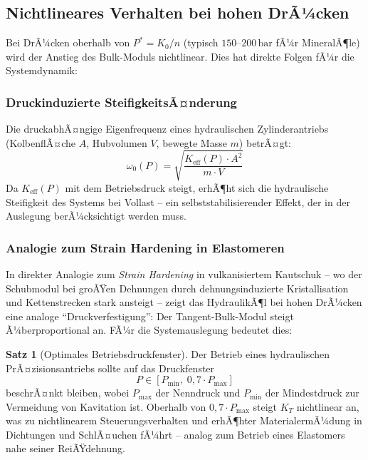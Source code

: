 ﻿\documentclass[a4paper,12pt]{scrreprt}
\theoremstyle{definition}
\newtheorem{satz}{Satz}[section]
\begin{document}
\subsection{Nichtlineares Verhalten bei hohen DrÃ¼cken}

Bei DrÃ¼cken oberhalb von $P^* = K_0 / n$ (typisch $150$--$200\,\mathrm{bar}$
fÃ¼r MineralÃ¶le) wird der Anstieg des Bulk-Moduls nichtlinear. Dies hat
direkte Folgen fÃ¼r die Systemdynamik:

\subsubsection{Druckinduzierte SteifigkeitsÃ¤nderung}

Die druckabhÃ¤ngige Eigenfrequenz eines hydraulischen Zylinderantriebs
(KolbenflÃ¤che $A$, Hubvolumen $V$, bewegte Masse $m$) betrÃ¤gt:
\begin{equation}
  \omega_0(P) = \sqrt{\frac{K_{\mathrm{eff}}(P) \cdot A^2}{m \cdot V}}
  \label{eq:eigenfrequenz}
\end{equation}
Da $K_{\mathrm{eff}}(P)$ mit dem Betriebsdruck steigt, erhÃ¶ht sich die
hydraulische Steifigkeit des Systems bei Vollast -- ein selbststabilisierender
Effekt, der in der Auslegung berÃ¼cksichtigt werden muss.

\subsubsection{Analogie zum Strain Hardening in Elastomeren}

In direkter Analogie zum \emph{Strain Hardening} in vulkanisiertem Kautschuk
-- wo der Schubmodul bei groÃŸen Dehnungen durch dehnungsinduzierte
Kristallisation und Kettenstrecken stark ansteigt -- zeigt das HydraulikÃ¶l
bei hohen DrÃ¼cken eine analoge ``Druckverfestigung'': Der
Tangent-Bulk-Modul steigt Ã¼berproportional an. FÃ¼r die Systemauslegung
bedeutet dies:

\begin{satz}[Optimales Betriebsdruckfenster]
  Der Betrieb eines hydraulischen PrÃ¤zisionsantriebs sollte auf das
  Druckfenster
  \begin{equation}
    P \in [P_{\min},\; 0{,}7 \cdot P_{\max}]
  \end{equation}
  beschrÃ¤nkt bleiben, wobei $P_{\max}$ der Nenndruck und $P_{\min}$
  der Mindestdruck zur Vermeidung von Kavitation ist. Oberhalb von
  $0{,}7 \cdot P_{\max}$ steigt $K_T$ nichtlinear an, was zu nichtlinearem
  Steuerungsverhalten und erhÃ¶hter MaterialermÃ¼dung in Dichtungen und
  SchlÃ¤uchen fÃ¼hrt -- analog zum Betrieb eines Elastomers nahe seiner
  ReiÃŸdehnung.
  \label{satz:betriebsdruckfenster}
\end{satz}
\end{document}
